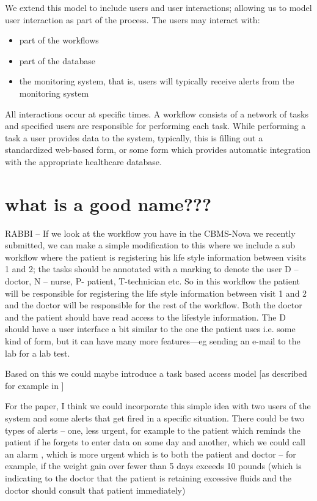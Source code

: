 \documentclass[a4paper]{llncs}
\begin{document}
We extend this model to include users and user interactions; allowing us to model user interaction as part of the process.  The users may interact with:  
\begin{itemize}
 \item part of the workflows
 \item part of the database
 \item the monitoring system, that is, users will typically receive alerts from the monitoring system
\end{itemize}

All interactions occur at specific times. A workflow consists of a network of tasks and specified users are responsible for performing each task. While performing a task a user provides data 
to the system, typically, this is filling out a standardized web-based form, or some form which provides automatic integration with the appropriate healthcare database.

\section{what is a good name???}

RABBI -- If we look at the workflow you have in the CBMS-Nova we recently submitted, we can make a simple modification to this where we include a sub workflow where the patient is registering 
his life style information between visits 1 and 2; the tasks should be annotated with a marking to denote the user 
D – doctor, N – nurse, P- patient, T-technician etc. So in this workflow the patient will be responsible for registering the life style information between visit 1 and 2 and  the doctor will 
be responsible for the rest of the workflow.
Both the doctor and the patient should have read access to the lifestyle information.
The D should have a user interface a bit similar to the one the patient uses i.e. some kind of form, but it can have many more features—eg sending an e-mail to the lab for a lab test.

Based on this we could maybe introduce a task based access model [as described for example in \cite{LeylaM11}] 

For the paper, I think we could incorporate this simple idea with two users of the system and some alerts that get fired in a specific situation. There could be two types of alerts – one, 
less urgent, for example  to the patient which reminds the patient if he forgets to enter data on some day and another, which we could call an alarm , which is more urgent which is to both 
the patient and doctor – for example,  if the weight gain over fewer than 5 days exceeds 10 pounds (which is indicating to the doctor that the patient is retaining excessive fluids and the 
doctor should consult that patient immediately)  
\end{document}

